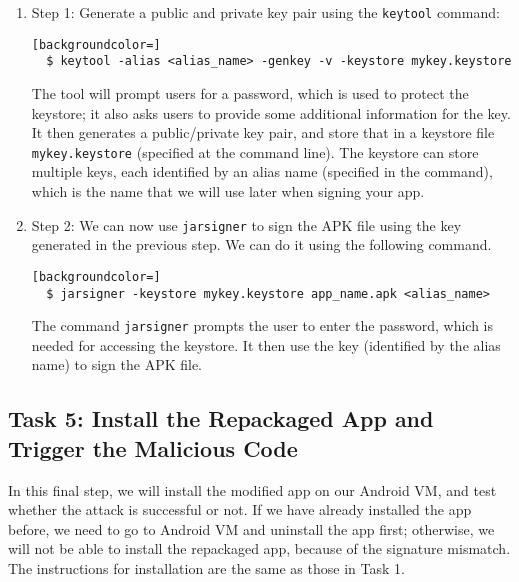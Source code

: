 \begin{enumerate}

\item Step 1: Generate a public and private key pair using the \texttt{keytool} command:

\begin{lstlisting}[backgroundcolor=]
  $ keytool -alias <alias_name> -genkey -v -keystore mykey.keystore
\end{lstlisting}

The tool will prompt users for a password, which is used to protect the keystore;
it also asks users to provide some additional information for the key. It then generates
a public/private key pair, and store that in a keystore file
\texttt{mykey.keystore} (specified at the command line).
The keystore can store multiple keys, each identified by an alias name (specified in
the command), which is the name that we will use later when signing your app.

\item Step 2: We can now use \texttt{jarsigner} to sign the APK file using the key
  generated in the previous step. We can do it using the following command.

\begin{lstlisting}[backgroundcolor=]
  $ jarsigner -keystore mykey.keystore app_name.apk <alias_name>
\end{lstlisting}

The command \texttt{jarsigner} prompts the user to enter the password,
which is needed for accessing the keystore. It then use the key (identified
by the alias name) to sign the APK file.
\end{enumerate}
 
 


\subsection{Task 5: Install the Repackaged App and Trigger the Malicious Code}

In this final step, we will install the modified app on our Android VM, and test whether
the attack is successful or not. If we have already installed
the app before, we need to go to Android VM and uninstall the app first; otherwise, we will not
be able to install the repackaged app, because of the signature mismatch.
The instructions for installation are the same as those in Task 1.


